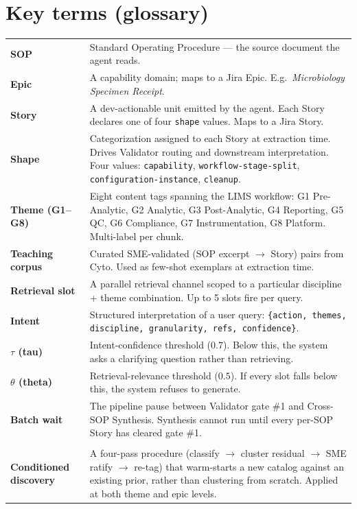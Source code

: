\documentclass[10pt,letterpaper]{article}
\begin{document}
\section{Key terms (glossary)}

\begin{tabularx}{\textwidth}{@{}>{\bfseries}p{2.5cm}X@{}}
\toprule
SOP & Standard Operating Procedure --- the source document the agent reads.\\
Epic & A capability domain; maps to a Jira Epic. E.g.\ \emph{Microbiology Specimen Receipt}.\\
Story & A dev-actionable unit emitted by the agent. Each Story declares one of four \texttt{shape} values. Maps to a Jira Story.\\
Shape & Categorization assigned to each Story at extraction time. Drives Validator routing and downstream interpretation. Four values: \texttt{capability}, \texttt{workflow-stage-split}, \texttt{configuration-instance}, \texttt{cleanup}.\\
Theme (G1--G8) & Eight content tags spanning the LIMS workflow: G1 Pre-Analytic, G2 Analytic, G3 Post-Analytic, G4 Reporting, G5 QC, G6 Compliance, G7 Instrumentation, G8 Platform. Multi-label per chunk.\\
Teaching corpus & Curated SME-validated (SOP excerpt $\rightarrow$ Story) pairs from Cyto. Used as few-shot exemplars at extraction time.\\
Retrieval slot & A parallel retrieval channel scoped to a particular discipline + theme combination. Up to 5 slots fire per query.\\
Intent & Structured interpretation of a user query: \texttt{\{action, themes, discipline, granularity, refs, confidence\}}.\\
$\tau$ (tau) & Intent-confidence threshold ($0.7$). Below this, the system asks a clarifying question rather than retrieving.\\
$\theta$ (theta) & Retrieval-relevance threshold ($0.5$). If every slot falls below this, the system refuses to generate.\\
Batch wait & The pipeline pause between Validator gate \#1 and Cross-SOP Synthesis. Synthesis cannot run until every per-SOP Story has cleared gate \#1.\\
\midrule
\multicolumn{2}{@{}l}{\itshape v3.2 additions:}\\
Conditioned discovery & A four-pass procedure (classify $\rightarrow$ cluster residual $\rightarrow$ SME ratify $\rightarrow$ re-tag) that warm-starts a new catalog against an existing prior, rather than clustering from scratch. Applied at both theme and epic levels.\\

\end{tabularx}
\end{document}

